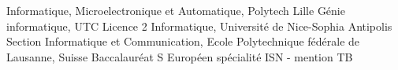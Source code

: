 %
%
%


\begin{scholarship}
					{Informatique, Microelectronique et Automatique, Polytech Lille}
					{Génie informatique, UTC}
					{Licence 2 Informatique, Université de Nice-Sophia Antipolis}
					{Section Informatique et Communication, Ecole Polytechnique fédérale de Lausanne, Suisse}
					{Baccalauréat S Européen spécialité ISN - mention TB}
\end{scholarship}